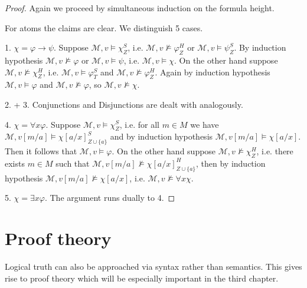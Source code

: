 \documentclass[a4paper,12pt]{report}
\theoremstyle{definition}
\theoremstyle{definition}
\theoremstyle{definition}
\theoremstyle{definition}
\theoremstyle{definition}
\theoremstyle{definition}
\theoremstyle{definition}
\begin{document}
	\begin{proof}
		Again we proceed by simultaneous induction on the formula height.
		
		For atoms the claims are clear. We distinguish 5 cases.
		
		1. $\chi = \varphi\to\psi$. Suppose $\mathcal M, v\models\chi^S_Z$, i.e. $\mathcal M, v\not\models\varphi^H_Z$ or $\mathcal M, v\models\psi^S_Z$. By induction hypothesis $\mathcal M, v\not\models \varphi$ or $\mathcal M, v\models\psi$, i.e. $\mathcal M, v\models \chi$. On the other hand suppose $\mathcal M, v\not\models\chi^H_Z$, i.e. $\mathcal M, v\models\varphi^S_T$ and $\mathcal M, v\not\models\varphi^H_Z$. Again by induction hypothesis $\mathcal M,v\models\varphi$ and $\mathcal M, v\not\models \varphi$, so $\mathcal M, v\not\models\chi$.
		
		2. + 3. Conjunctions and Disjunctions are dealt with analogously.
		
		4. $\chi = \forall x\varphi$.  Suppose $\mathcal M, v\models\chi^S_Z$, i.e. for all $m\in M$ we have $\mathcal M, v[m/a]\models \chi[a/x]^S_{Z\cup\{a\}}$ and by induction hypothesis $\mathcal M, v[m/a]\models \chi[a/x]$. Then it follows that $\mathcal M, v\models\varphi$. On the other hand suppose $\mathcal M, v\not\models\chi^H_Z$, i.e. there exists $m\in M$ such that $\mathcal M, v[m/a]\not\models\chi[a/x]^H_{Z\cup \{a\}}$, then by induction hypothesis $\mathcal M, v[m/a]\not\models \chi[a/x]$, i.e. $\mathcal M, v\not\models\forall x\chi$.
		
		5. $\chi = \exists x\varphi$.  The argument runs dually to 4.
	\end{proof}
	
	\section{Proof theory}
	
	Logical truth can also be approached via syntax rather than semantics. This gives rise to proof theory which will be especially important in the third chapter.
		
\end{document}
